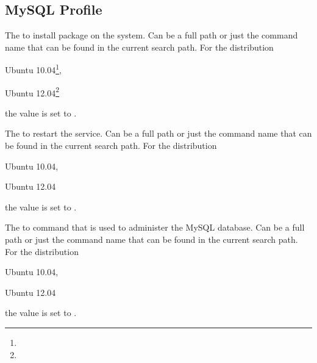 \label{sec:mysql_profile}
\subsection{MySQL Profile}


The  to install package on the system. Can be a full path or
just the command name that can be found in the current search path. 
For the distribution
\begin{inparaitem}
\item[\TheDistribution{ubuntu}] Ubuntu 10.04\footnote{\TheUbuntuMaverickLTSDate},
\item[\TheDistribution{ubuntu}] Ubuntu 12.04\footnote{\TheUbuntuPreciseLTSDate}
\end{inparaitem}
the value is set to .


The  to restart the service. Can be a full path or
just the command name that can be found in the current search path. 
For the distribution
\begin{inparaitem}
\item[\TheDistribution{ubuntu}] Ubuntu 10.04,
\item[\TheDistribution{ubuntu}] Ubuntu 12.04
\end{inparaitem}
the value is set to .


The  to  command that is used to administer the 
MySQL database. Can be a full path or
just the command name that can be found in the current search path. 
For the distribution
\begin{inparaitem}
\item[\TheDistribution{ubuntu}] Ubuntu 10.04,
\item[\TheDistribution{ubuntu}] Ubuntu 12.04
\end{inparaitem}
the value is set to .

